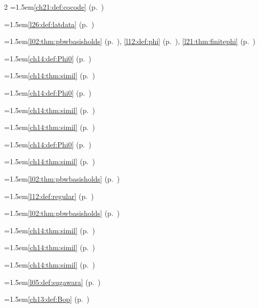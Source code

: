 \begin{multicols}{2}
\hangindent=1.5em\quad \ref{ch21:def:cocode} (p.~\pageref{ch21:def:cocode})\par
\par{}\par\nopagebreak\smallskip
\hangindent=1.5em\quad \ref{l26:def:latdata} (p.~\pageref{l26:def:latdata})\par
\par{}\par\nopagebreak\smallskip
\hangindent=1.5em\quad \ref{l02:thm:pbwbasisholds} (p.~\pageref{l02:thm:pbwbasisholds}), \ref{l12:def:phi} (p.~\pageref{l12:def:phi}), \ref{l21:thm:finitephi} (p.~\pageref{l21:thm:finitephi})\par
\hangindent=1.5em\quad \ref{ch14:def:Phi0} (p.~\pageref{ch14:def:Phi0})\par
\hangindent=1.5em\quad \ref{ch14:thm:simil} (p.~\pageref{ch14:thm:simil})\par
\hangindent=1.5em\quad \ref{ch14:def:Phi0} (p.~\pageref{ch14:def:Phi0})\par
\hangindent=1.5em\quad \ref{ch14:thm:simil} (p.~\pageref{ch14:thm:simil})\par
\hangindent=1.5em\quad \ref{ch14:thm:simil} (p.~\pageref{ch14:thm:simil})\par
\hangindent=1.5em\quad \ref{ch14:def:Phi0} (p.~\pageref{ch14:def:Phi0})\par
\hangindent=1.5em\quad \ref{ch14:thm:simil} (p.~\pageref{ch14:thm:simil})\par
\hangindent=1.5em\quad \ref{l02:thm:pbwbasisholds} (p.~\pageref{l02:thm:pbwbasisholds})\par
\hangindent=1.5em\quad \ref{l12:def:regular} (p.~\pageref{l12:def:regular})\par
\hangindent=1.5em\quad \ref{l02:thm:pbwbasisholds} (p.~\pageref{l02:thm:pbwbasisholds})\par
\par{}\par\nopagebreak\smallskip
\hangindent=1.5em\quad \ref{ch14:thm:simil} (p.~\pageref{ch14:thm:simil})\par
\hangindent=1.5em\quad \ref{ch14:thm:simil} (p.~\pageref{ch14:thm:simil})\par
\hangindent=1.5em\quad \ref{ch14:thm:simil} (p.~\pageref{ch14:thm:simil})\par
\par{}\par\nopagebreak\smallskip
\hangindent=1.5em\quad \ref{l05:def:sugawara} (p.~\pageref{l05:def:sugawara})\par
\hangindent=1.5em\quad \ref{ch13:def:Bop} (p.~\pageref{ch13:def:Bop})\par
\end{multicols}\endgroup
